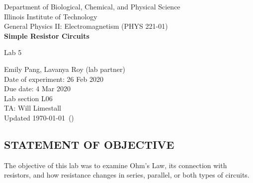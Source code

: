 \documentclass [12pt, letterpaper, twoside] {article}
\begin{document}
\begin {titlepage}
\begin {center}
Department of Biological, Chemical, and Physical Science\\
\vspace {0.1cm}
Illinois Institute of Technology\\
\vspace {0.1cm}
General Physics II: Electromagnetism (PHYS 221-01)\\
\vspace* {\fill}
\begingroup
\Large
\textbf {Simple Resistor Circuits}
\vspace {0.35cm}

\normalsize
Lab 5 
\vspace {1.5cm}
\endgroup
\vspace* {\fill}
\end {center}

\vspace*{\fill}
\begin {flushright}
\footnotesize
Emily Pang, Lavanya Roy (lab partner) \\
Date of experiment: 26 Feb 2020 \\
Due date: 4 Mar 2020 \\
Lab section L06 \\
TA: Will Limestall \\
Updated \usdate\today~(\currenttime)
\end {flushright}
\end {titlepage}
\subsection* {STATEMENT OF OBJECTIVE}
The objective of this lab was to examine Ohm's Law, its connection with resistors, and how resistance changes in series, parallel, or both types of circuits.
\end{document}
